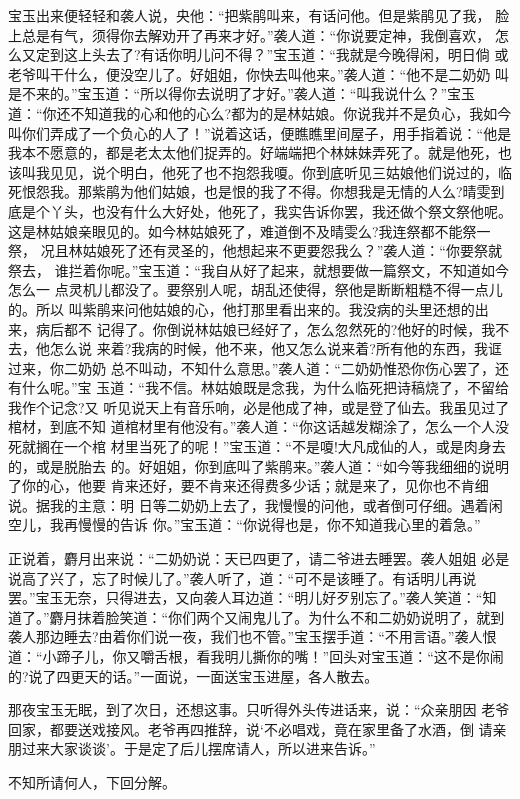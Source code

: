 宝玉出来便轻轻和袭人说，央他：“把紫鹃叫来，有话问他。但是紫鹃见了我，
脸上总是有气，须得你去解劝开了再来才好。”袭人道：“你说要定神，我倒喜欢，
怎么又定到这上头去了?有话你明儿问不得？”宝玉道：“我就是今晚得闲，明日倘
或老爷叫干什么，便没空儿了。好姐姐，你快去叫他来。”袭人道：“他不是二奶奶
叫是不来的。”宝玉道：“所以得你去说明了才好。”袭人道：“叫我说什么？”宝玉
道：“你还不知道我的心和他的心么?都为的是林姑娘。你说我并不是负心，我如今
叫你们弄成了一个负心的人了！”说着这话，便瞧瞧里间屋子，用手指着说：“他是
我本不愿意的，都是老太太他们捉弄的。好端端把个林妹妹弄死了。就是他死，也
该叫我见见，说个明白，他死了也不抱怨我嗄。你到底听见三姑娘他们说过的，临
死恨怨我。那紫鹃为他们姑娘，也是恨的我了不得。你想我是无情的人么?晴雯到
底是个丫头，也没有什么大好处，他死了，我实告诉你罢，我还做个祭文祭他呢。
这是林姑娘亲眼见的。如今林姑娘死了，难道倒不及晴雯么?我连祭都不能祭一祭，
况且林姑娘死了还有灵圣的，他想起来不更要怨我么？”袭人道：“你要祭就祭去，
谁拦着你呢。”宝玉道：“我自从好了起来，就想要做一篇祭文，不知道如今怎么一
点灵机儿都没了。要祭别人呢，胡乱还使得，祭他是断断粗糙不得一点儿的。所以
叫紫鹃来问他姑娘的心，他打那里看出来的。我没病的头里还想的出来，病后都不
记得了。你倒说林姑娘已经好了，怎么忽然死的?他好的时候，我不去，他怎么说
来着?我病的时候，他不来，他又怎么说来着?所有他的东西，我诓过来，你二奶奶
总不叫动，不知什么意思。”袭人道：“二奶奶惟恐你伤心罢了，还有什么呢。”宝
玉道：“我不信。林姑娘既是念我，为什么临死把诗稿烧了，不留给我作个记念?又
听见说天上有音乐响，必是他成了神，或是登了仙去。我虽见过了棺材，到底不知
道棺材里有他没有。”袭人道：“你这话越发糊涂了，怎么一个人没死就搁在一个棺
材里当死了的呢！”宝玉道：“不是嗄!大凡成仙的人，或是肉身去的，或是脱胎去
的。好姐姐，你到底叫了紫鹃来。”袭人道：“如今等我细细的说明了你的心，他要
肯来还好，要不肯来还得费多少话；就是来了，见你也不肯细说。据我的主意：明
日等二奶奶上去了，我慢慢的问他，或者倒可仔细。遇着闲空儿，我再慢慢的告诉
你。”宝玉道：“你说得也是，你不知道我心里的着急。”

正说着，麝月出来说：“二奶奶说：天已四更了，请二爷进去睡罢。袭人姐姐
必是说高了兴了，忘了时候儿了。”袭人听了，道：“可不是该睡了。有话明儿再说
罢。”宝玉无奈，只得进去，又向袭人耳边道：“明儿好歹别忘了。”袭人笑道：“知
道了。”麝月抹着脸笑道：“你们两个又闹鬼儿了。为什么不和二奶奶说明了，就到
袭人那边睡去?由着你们说一夜，我们也不管。”宝玉摆手道：“不用言语。”袭人恨
道：“小蹄子儿，你又嚼舌根，看我明儿撕你的嘴！”回头对宝玉道：“这不是你闹
的?说了四更天的话。”一面说，一面送宝玉进屋，各人散去。

那夜宝玉无眠，到了次日，还想这事。只听得外头传进话来，说：“众亲朋因
老爷回家，都要送戏接风。老爷再四推辞，说‘不必唱戏，竟在家里备了水酒，倒
请亲朋过来大家谈谈’。于是定了后儿摆席请人，所以进来告诉。”

不知所请何人，下回分解。